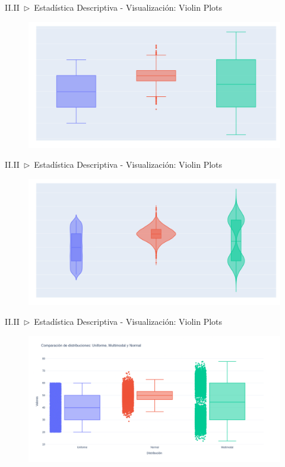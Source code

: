 \documentclass[xcolor=dvipsnames]{beamer}
\begin{document}
    \begin{frame}{II.II~$\rhd$~Estadística Descriptiva - Visualización: Violin Plots}
        \begin{figure}
        \centering
        \includegraphics[width=\textwidth]{imgs/violin/ej2_01.png}
        \end{figure}
    \end{frame}

    \begin{frame}{II.II~$\rhd$~Estadística Descriptiva - Visualización: Violin Plots}
        \begin{figure}
        \centering
        \includegraphics[width=\textwidth]{imgs/violin/ej2_02.png}
        \end{figure}
    \end{frame}

    \begin{frame}{II.II~$\rhd$~Estadística Descriptiva - Visualización: Violin Plots}
        \begin{figure}
        \centering
        \includegraphics[width=\textwidth]{imgs/violin/ej2_03.png}
        \end{figure}
    \end{frame}
\end{document}

